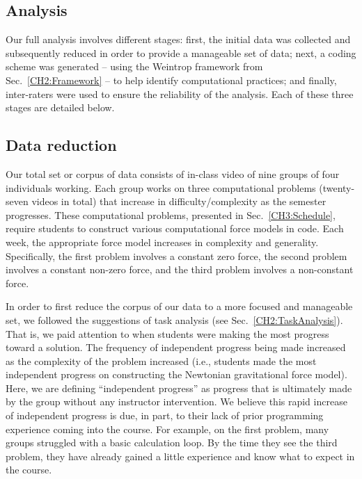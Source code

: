 \documentclass{msuphddissertation}
\begin{document}
\begin{doublespace}
\section{Analysis}\label{CH5:Analysis}

Our full analysis involves different stages: first, the initial data was collected and subsequently reduced in order to provide a manageable set of data; next, a coding scheme was generated -- using the Weintrop framework from Sec.~\ref{CH2:Framework} -- to help identify computational practices; and finally, inter-raters were used to ensure the reliability of the analysis.  Each of these three stages are detailed below.


\subsection{Data reduction}

Our total set or corpus of data consists of in-class video of nine groups of four individuals working.  Each group works on three computational problems (twenty-seven videos in total) that increase in difficulty/complexity as the semester progresses.  These computational problems, presented in Sec.~\ref{CH3:Schedule}, require students to construct various computational force models in code.  Each week, the appropriate force model increases in complexity and generality.  Specifically, the first problem involves a constant zero force, the second problem involves a constant non-zero force, and the third problem involves a non-constant force.

In order to first reduce the corpus of our data to a more focused and manageable set, we followed the suggestions of task analysis (see Sec.~\ref{CH2:TaskAnalysis}).  That is, we paid attention to when students were making the most progress toward a solution.  The frequency of independent progress being made increased as the complexity of the problem increased (i.e., students made the most independent progress on constructing the Newtonian gravitational force model).  Here, we are defining ``independent progress'' as progress that is ultimately made by the group without any instructor intervention.  We believe this rapid increase of independent progress is due, in part, to their lack of prior programming experience coming into the course.  For example, on the first problem, many groups struggled with a basic calculation loop.  By the time they see the third problem, they have already gained a little experience and know what to expect in the course.


\end{doublespace}
\end{document}
